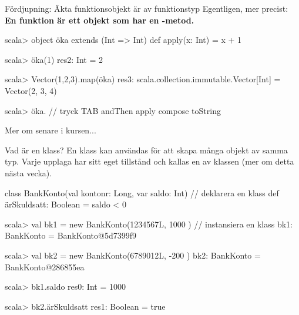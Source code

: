 \begin{Slide}{Fördjupning: Äkta funktionsobjekt är av funktionstyp}
Egentligen, mer precist:\\
\textbf{En funktion är ett objekt  som har en -metod.}
\pause
\begin{REPLnonum}
scala> object öka extends (Int => Int) {
         def apply(x: Int) = x + 1
       }

scala> öka(1)
res2: Int = 2

scala> Vector(1,2,3).map(öka)
res3: scala.collection.immutable.Vector[Int] = Vector(2, 3, 4)

scala> öka.   // tryck TAB
andThen   apply   compose   toString
\end{REPLnonum}
Mer om  senare i kursen... %
\end{Slide}




\begin{Slide}{Vad är en klass?}
En klass kan användas för att skapa många objekt av samma typ. Varje upplaga har sitt eget tillstånd och kallas en  av klassen (mer om detta nästa vecka).
\begin{Code}
class BankKonto(val kontonr: Long, var saldo: Int)  {  // deklarera en klass
  def ärSkuldsatt: Boolean = saldo < 0
}
\end{Code}
\pause
\begin{REPL}
scala> val bk1 = new BankKonto(1234567L, 1000 )   // instansiera en klass
bk1: BankKonto = BankKonto@5d7399f9

scala> val bk2 = new BankKonto(6789012L, -200 )
bk2: BankKonto = BankKonto@286855ea

scala> bk1.saldo
res0: Int = 1000

scala> bk2.ärSkuldsatt
res1: Boolean = true
\end{REPL}
\end{Slide}

